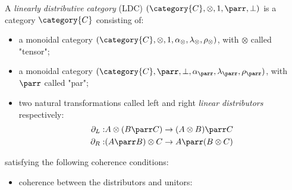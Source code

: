 \documentclass[DIN, pagenumber=false, fontsize=11pt, parskip=half, colorinlistoftodos, svgnames]{scrartcl}
\begin{document}
	\begin{definition}
		\label{def: linDisCat}
		A \emph{linearly} \emph{distributive} \emph{category} (LDC) $(\category{C}, \otimes, 1, \parr, \bot)$ is a category $\category{C}$ consisting of:
		\begin{itemize}
			\item a monoidal category $(\category{C}, \otimes, 1, \alpha_\otimes, \lambda_\otimes, \rho_\otimes)$, with $\otimes$ called "tensor";
			\item a monoidal  category $(\category{C}, \parr, \bot, \alpha_\parr, \lambda_\parr, \rho_\parr)$, with $\parr$ called "par";
			\item two natural transformations called left and right \emph{linear distributors} respectively:
			\begin{align*}
				\partial_L:& A \otimes (B \parr C) \rightarrow (A\otimes B) \parr C
				\\
				\partial_R:& (A \parr B) \otimes C \rightarrow A \parr (B \otimes C)
			\end{align*}
		\end{itemize}
		satisfying the following coherence conditions:
		\begin{itemize}
			\item 
				coherence between the distributors and unitors:
				\begin{center}
					

\end{center}
\end{itemize}
\end{definition}
\end{document}
